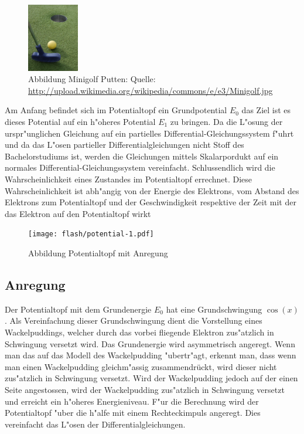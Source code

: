 \begin{refsection}
\begin{figure}
\centering
\includegraphics[width=0.2\textwidth]{flash/graphics/Minigolf.jpg}
\caption{Abbildung Minigolf Putten: Quelle:
\url{http://upload.wikimedia.org/wikipedia/commons/e/e3/Minigolf.jpg}
\label{skript:Minigolf}}
\end{figure}

Am Anfang befindet sich im Potentialtopf ein Grundpotential $E_{0}$
das Ziel ist es dieses Potential auf ein h"oheres Potential $E_{1}$
zu bringen. Da die L"osung der urspr"unglichen Gleichung auf ein
partielles Differential-Gleichungssystem f"uhrt und da das L"osen
partieller Differentialgleichungen nicht Stoff des Bachelorstudiums
ist, werden die Gleichungen mittels Skalarpordukt auf ein normales
Differential-Gleichungssystem vereinfacht. Schlussendlich wird die
Wahrscheinlichkeit eines Zustandes im Potentialtopf errechnet. Diese
Wahrscheinlichkeit ist abh"angig von der Energie des Elektrons, vom
Abstand des Elektrons zum Potentialtopf und der Geschwindigkeit respektive
der Zeit mit der das Elektron auf den Potentialtopf wirkt

\begin{figure}
\centering
\texttt{[image: flash/potential-1.pdf]}
\caption{{Abbildung Potentialtopf mit Anregung}
\label{skript:PotAnregung}}
\end{figure}

\subsection{Anregung}
Der Potentialtopf mit dem Grundenergie $E_{0}$ hat eine Grundschwingung
$\cos(x)$.  Als Vereinfachung dieser Grundschwingung dient die
Vorstellung eines Wackelpuddings, welcher durch das vorbei fliegende
Elektron zus"atzlich in Schwingung versetzt wird.  Das Grundenergie
wird asymmetrisch angeregt. Wenn man das auf das Modell des
Wackelpudding "ubertr"agt, erkennt man, dass wenn man einen Wackelpudding
gleichm"assig zusammendrückt, wird dieser nicht zus"atzlich in Schwingung
versetzt. Wird der Wackelpudding jedoch auf der einen Seite angestossen,
wird der Wackelpudding zus"atzlich in Schwingung versetzt und erreicht
ein h"oheres Energieniveau.  F"ur die Berechnung wird der Potentialtopf
"uber die h"alfe mit einem Rechteckimpuls angeregt. Dies vereinfacht
das L"osen der Differentialgleichungen.


\end{refsection}
